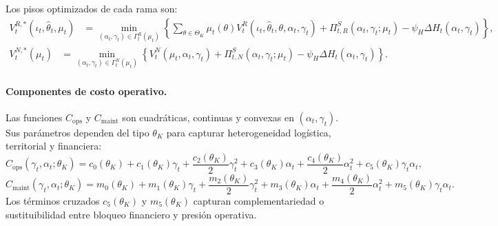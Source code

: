 \documentclass[12pt]{article}
\theoremstyle{definition}
\theoremstyle{remark}
\newcommand{\1}{\mathbf{1}}
\begin{document}
Los pisos optimizados de cada rama son:
\begin{equation}
\label{eq:rescue-cost}
\begin{aligned}
V_t^{R,*}(\iota_t,\hat{\theta}_t,\mu_t)
&=
\min_{(\alpha_t,\gamma_t)\in\Gamma_t^R(\mu_t)}
\left\{
\sum_{\theta\in\Theta_K}\mu_t(\theta)
V_t^R(\iota_t,\hat{\theta}_t,\theta,\alpha_t,\gamma_t)
+\Pi_{t,R}^{S}(\alpha_t,\gamma_t;\mu_t)
-\psi_H\Delta H_t(\alpha_t,\gamma_t)
\right\},
\end{aligned}
\end{equation}
\begin{equation}
\label{eq:negotiation-piso}
\begin{aligned}
V_t^{N,*}(\mu_t)
&=
\min_{(\alpha_t,\gamma_t)\in\Gamma_t^N(\mu_t)}
\left\{
V_t^N(\mu_t,\alpha_t,\gamma_t)
+\Pi_{t,N}^{S}(\alpha_t,\gamma_t;\mu_t)
-\psi_H\Delta H_t(\alpha_t,\gamma_t)
\right\}.
\end{aligned}
\end{equation}

\paragraph{Componentes de costo operativo.}
Las funciones $C_{\mathrm{ops}}$ y $C_{\mathrm{maint}}$ son cuadráticas, continuas y convexas en $(\alpha_t,\gamma_t)$. Sus parámetros dependen del tipo $\theta_K$ para capturar heterogeneidad logística, territorial y financiera:
\begin{equation}
\label{eq:cops-quadratic}
C_{\mathrm{ops}}(\gamma_t,\alpha_t;\theta_K)
=
c_0(\theta_K)+c_1(\theta_K)\gamma_t+\frac{c_2(\theta_K)}{2}\gamma_t^2
+c_3(\theta_K)\alpha_t+\frac{c_4(\theta_K)}{2}\alpha_t^2
+c_5(\theta_K)\gamma_t\alpha_t,
\end{equation}
\begin{equation}
\label{eq:cmaint-quadratic}
C_{\mathrm{maint}}(\gamma_t,\alpha_t;\theta_K)
=
m_0(\theta_K)+m_1(\theta_K)\gamma_t+\frac{m_2(\theta_K)}{2}\gamma_t^2
+m_3(\theta_K)\alpha_t+\frac{m_4(\theta_K)}{2}\alpha_t^2
+m_5(\theta_K)\gamma_t\alpha_t.
\end{equation}
Los términos cruzados $c_5(\theta_K)$ y $m_5(\theta_K)$ capturan complementariedad o sustituibilidad entre bloqueo financiero y presión operativa.
\end{document}
